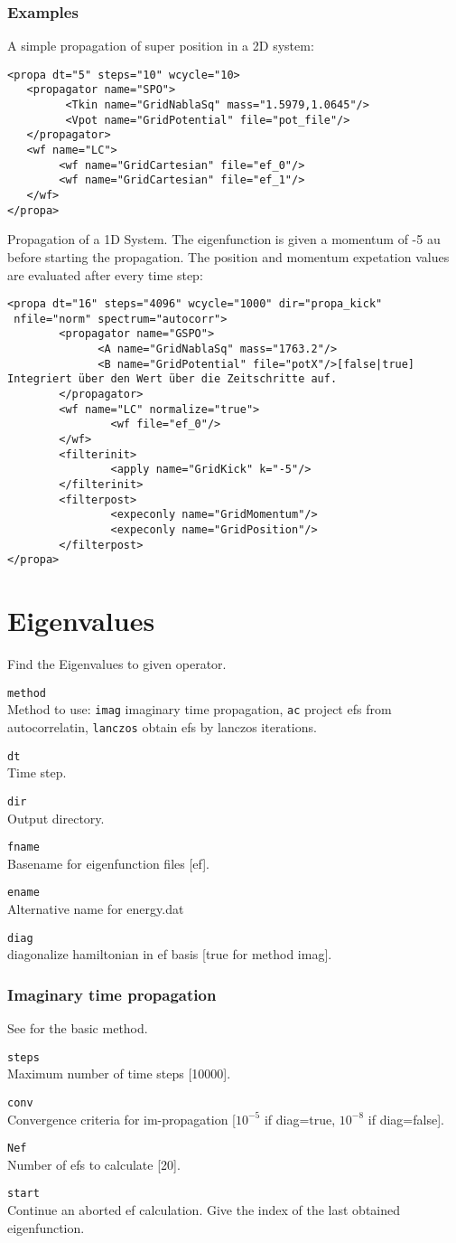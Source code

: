 \documentclass[a4paper,12pt]{scrbook}
\newcommand{\option}[2]{\item \texttt{#1}\\ #2}
\newcommand{\code}[1]{\texttt{#1}}
\begin{document}
\subsubsection*{Examples}
A simple propagation of super position in a 2D system:
\begin{verbatim}
<propa dt="5" steps="10" wcycle="10>
   <propagator name="SPO">
         <Tkin name="GridNablaSq" mass="1.5979,1.0645"/>
         <Vpot name="GridPotential" file="pot_file"/>
   </propagator>
   <wf name="LC">
        <wf name="GridCartesian" file="ef_0"/>
        <wf name="GridCartesian" file="ef_1"/>
   </wf>
</propa>
\end{verbatim}

Propagation of a 1D System. The eigenfunction is given a momentum of -5 au before starting the
propagation. The position and momentum expetation values are evaluated after every time step:
\begin{verbatim}
<propa dt="16" steps="4096" wcycle="1000" dir="propa_kick"
 nfile="norm" spectrum="autocorr">
        <propagator name="GSPO">
              <A name="GridNablaSq" mass="1763.2"/>
              <B name="GridPotential" file="potX"/>[false|true] Integriert über den Wert über die Zeitschritte auf.
        </propagator>
        <wf name="LC" normalize="true">
                <wf file="ef_0"/>
        </wf>
        <filterinit>
                <apply name="GridKick" k="-5"/>
        </filterinit>
        <filterpost>
                <expeconly name="GridMomentum"/>
                <expeconly name="GridPosition"/>
        </filterpost>
</propa>
\end{verbatim}


\section{Eigenvalues}
Find the Eigenvalues to given operator.

\begin{options}
\option{method}{Method to use: \code{imag} imaginary time propagation, \code{ac} project efs from autocorrelatin, \code{lanczos} obtain efs by lanczos iterations.}
\option{dt}{Time step.}
\option{dir}{Output directory.}
\option{fname}{Basename for eigenfunction files [ef].}
\option{ename}{Alternative name for energy.dat}
\option{diag}{diagonalize hamiltonian in ef basis [true for method imag].}
\end{options}

\subsubsection*{Imaginary time propagation}
See \cite{Ezer86} for the basic method.
\begin{options}
\option{steps}{Maximum number of time steps [10000].}
\option{conv}{Convergence criteria for im-propagation [$10^{-5}$ if diag=true, $10^{-8}$ if diag=false].}
\option{Nef}{Number of efs to calculate [20].}
\option{start}{Continue an aborted ef calculation. Give the index of the last
obtained eigenfunction.}
\end{options}
\end{document}
